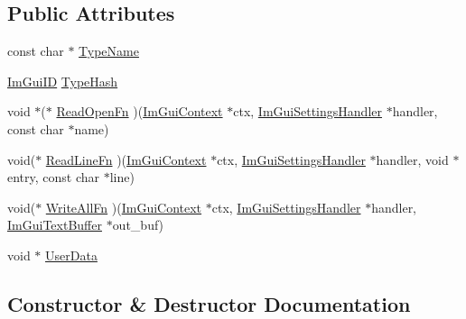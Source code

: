 \subsection*{Public Attributes}
\begin{DoxyCompactItemize}
\item 
const char $\ast$ \mbox{\hyperlink{struct_im_gui_settings_handler_a2b2821603e32a669c855dd97757c83c8}{Type\+Name}}
\item 
\mbox{\hyperlink{imgui_8h_a1785c9b6f4e16406764a85f32582236f}{Im\+Gui\+ID}} \mbox{\hyperlink{struct_im_gui_settings_handler_ac2dd47bdb91ae6f50afb5ac14222b552}{Type\+Hash}}
\item 
void $\ast$($\ast$ \mbox{\hyperlink{struct_im_gui_settings_handler_accadc3cc1599382b55b58dac53df0b24}{Read\+Open\+Fn}} )(\mbox{\hyperlink{struct_im_gui_context}{Im\+Gui\+Context}} $\ast$ctx, \mbox{\hyperlink{struct_im_gui_settings_handler}{Im\+Gui\+Settings\+Handler}} $\ast$handler, const char $\ast$name)
\item 
void($\ast$ \mbox{\hyperlink{struct_im_gui_settings_handler_a0a02bad8569c2d9f22e1a532d1e2de60}{Read\+Line\+Fn}} )(\mbox{\hyperlink{struct_im_gui_context}{Im\+Gui\+Context}} $\ast$ctx, \mbox{\hyperlink{struct_im_gui_settings_handler}{Im\+Gui\+Settings\+Handler}} $\ast$handler, void $\ast$entry, const char $\ast$line)
\item 
void($\ast$ \mbox{\hyperlink{struct_im_gui_settings_handler_a8f9d8923be4df1b5e6c17f9857b955f4}{Write\+All\+Fn}} )(\mbox{\hyperlink{struct_im_gui_context}{Im\+Gui\+Context}} $\ast$ctx, \mbox{\hyperlink{struct_im_gui_settings_handler}{Im\+Gui\+Settings\+Handler}} $\ast$handler, \mbox{\hyperlink{struct_im_gui_text_buffer}{Im\+Gui\+Text\+Buffer}} $\ast$out\+\_\+buf)
\item 
void $\ast$ \mbox{\hyperlink{struct_im_gui_settings_handler_a4e8dc5a10948568680764a3cdaf9b102}{User\+Data}}
\end{DoxyCompactItemize}


\subsection{Constructor \& Destructor Documentation}
\mbox{\label{struct_im_gui_settings_handler_ab84610a000c843d4e303e41e260fb1df}} 
